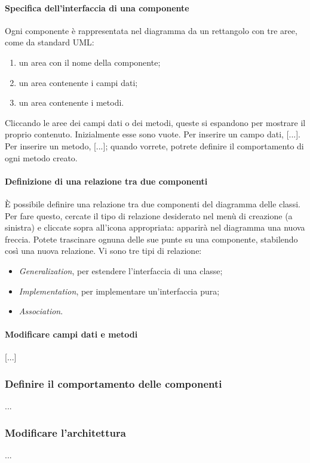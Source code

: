 \paragraph{Specifica dell'interfaccia di una componente} Ogni componente è rappresentata nel diagramma da un rettangolo con tre aree, come da standard UML:
\begin{enumerate}
	\item un area con il nome della componente;
	\item un area contenente i campi dati;
	\item un area contenente i metodi.
\end{enumerate}
Cliccando le aree dei campi dati o dei metodi, queste si espandono per mostrare il proprio contenuto. Inizialmente esse sono vuote. Per inserire un campo dati, [...]. Per inserire un metodo, [...]; quando vorrete, potrete definire il comportamento di ogni metodo creato.

\paragraph{Definizione di una relazione tra due componenti} È possibile definire una relazione tra due componenti del diagramma delle classi. Per fare questo, cercate il tipo di relazione desiderato nel menù di creazione (a sinistra) e cliccate sopra all'icona appropriata: apparirà nel diagramma una nuova freccia. Potete trascinare ognuna delle sue punte su una componente, stabilendo così una nuova relazione. Vi sono tre tipi di relazione:
\begin{itemize}
	\item \emph{Generalization}, per estendere l'interfaccia di una classe;
	\item \emph{Implementation}, per implementare un'interfaccia pura;
	\item \emph{Association}. %
\end{itemize}

\paragraph{Modificare campi dati e metodi} [...] %


\subsubsection{Definire il comportamento delle componenti}
...

\subsubsection{Modificare l'architettura}
...

